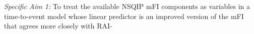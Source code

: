 \emph{Specific Aim 1:} To treat the available NSQIP mFI components as variables in a time-to-event model whose linear predictor is an improved version of the mFI that agrees more closely with RAI-
